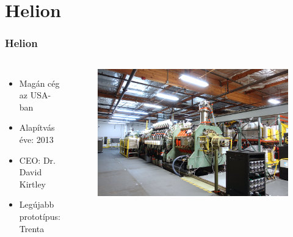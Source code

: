 \documentclass{beamer}
\begin{document}
\section{Helion}
\begin{frame}
    \frametitle{Helion}
    \begin{columns}
        \begin{itemize}
            \item Magán cég az USA-ban
            \item Alapítvás éve: 2013
            \item CEO: Dr. David Kirtley
            \item Legújabb prototípus: Trenta
        \end{itemize}
        \begin{figure}
            \includegraphics[scale=0.2]{trenta-1-1400x934.png}
        \end{figure}    
    \end{columns}
\end{frame}
\end{document}
